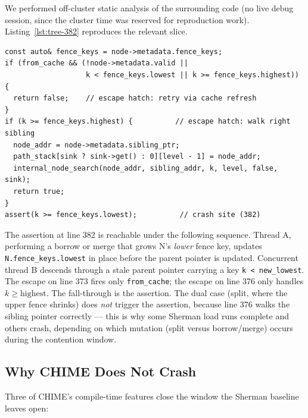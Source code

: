 \documentclass[11pt,a4paper]{article}
\begin{document}
We performed off-cluster static analysis of the surrounding code (no live debug session, since the cluster time was reserved for reproduction work). Listing~\ref{lst:tree-382} reproduces the relevant slice.

\begin{lstlisting}[caption={\texttt{src/Tree.cpp}, lines 372--385: the assertion site at 382 has escape hatches for cache-staleness and for $k \ge \mathrm{highest}$, but \emph{not} for $k < \mathrm{lowest}$ on a non-cached read.},label={lst:tree-382}]
const auto& fence_keys = node->metadata.fence_keys;
if (from_cache && (!node->metadata.valid ||
                   k < fence_keys.lowest || k >= fence_keys.highest)) {
  return false;    // escape hatch: retry via cache refresh
}
if (k >= fence_keys.highest) {          // escape hatch: walk right sibling
  node_addr = node->metadata.sibling_ptr;
  path_stack[sink ? sink->get() : 0][level - 1] = node_addr;
  internal_node_search(node_addr, sibling_addr, k, level, false, sink);
  return true;
}
assert(k >= fence_keys.lowest);          // crash site (382)
\end{lstlisting}

The assertion at line 382 is reachable under the following sequence. Thread A, performing a borrow or merge that grows N's \emph{lower} fence key, updates \texttt{N.fence\_keys.lowest} in place before the parent pointer is updated. Concurrent thread B descends through a stale parent pointer carrying a key \texttt{k < new\_lowest}. The escape on line 373 fires only \texttt{from\_cache}; the escape on line 376 only handles $k \ge \mathrm{highest}$. The fall-through is the assertion. The dual case (split, where the upper fence shrinks) does \emph{not} trigger the assertion, because line 376 walks the sibling pointer correctly --- this is why some Sherman load runs complete and others crash, depending on which mutation (split versus borrow/merge) occurs during the contention window.

\subsection{Why CHIME Does Not Crash}
\label{sec:stress-why-chime}

Three of CHIME's compile-time features close the window the Sherman baseline leaves open:
\end{document}

